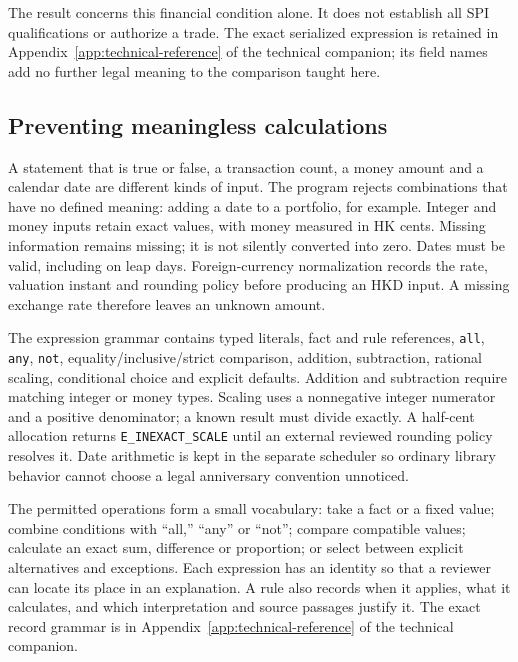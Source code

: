 The result concerns this financial condition alone. It does not establish all
SPI qualifications or authorize a trade. The exact serialized expression is
retained in Appendix~\ref{app:technical-reference} of the technical companion; its field names add no further
legal meaning to the comparison taught here.

\subsection{Preventing meaningless calculations}
\label{merge:P-03a-rule-contract:00}


A statement that is true or false, a transaction count, a money amount and a
calendar date are different kinds of input. The program rejects combinations
that have no defined meaning: adding a date to a portfolio, for example. Integer
and money inputs retain exact values, with money measured in HK cents. Missing
information remains missing; it is not silently converted into zero. Dates must
be valid, including on leap days. Foreign-currency normalization
records the rate, valuation instant and rounding policy before producing an HKD
input. A missing exchange rate therefore leaves an unknown amount.

The expression grammar contains typed literals, fact and rule references,
\texttt{all}, \texttt{any}, \texttt{not}, equality/inclusive/strict comparison,
addition, subtraction, rational scaling, conditional choice and explicit defaults.
Addition and subtraction require matching integer or money types. Scaling uses
a nonnegative integer numerator and a positive denominator; a known result must
divide exactly. A half-cent allocation returns \texttt{E\_INEXACT\_SCALE} until
an external reviewed rounding policy resolves it. Date arithmetic is kept in
the separate scheduler so ordinary library behavior cannot choose a legal
anniversary convention unnoticed.


The permitted operations form a small vocabulary: take a fact or a fixed
value; combine conditions with ``all,'' ``any'' or ``not''; compare compatible
values; calculate an exact sum, difference or proportion; or select between
explicit alternatives and exceptions. Each expression has an identity so that a
reviewer can locate its place in an explanation. A rule also records when it
applies, what it calculates, and which interpretation and source passages justify
it. The exact record grammar is in Appendix~\ref{app:technical-reference} of the technical companion.


